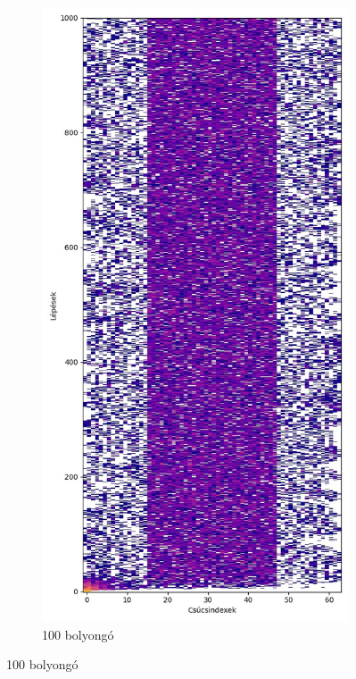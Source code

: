 \begin{figure}[H]
  \centering
  \begin{subfigure}{.45\linewidth}
    \centering
    \includegraphics[width=\linewidth]{./figures/ragasztott_binaris/sim02.jpg}
    \caption{100 bolyongó}

\end{subfigure}
\end{figure}
